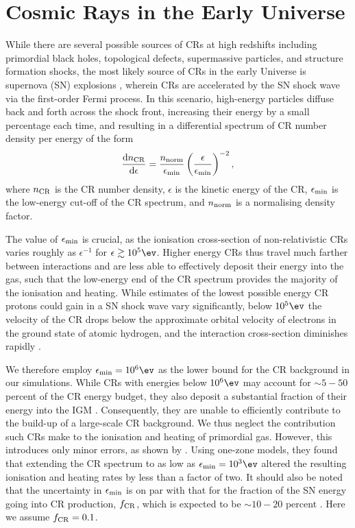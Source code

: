 \section{Cosmic Rays in the Early Universe}
\label{sec:context}
While there are several possible sources of CRs at high redshifts including primordial black holes, topological defects, supermassive particles, and structure formation shocks, the most likely source of CRs in the early Universe is supernova (SN) explosions \citep[e.g.,][]{GinzburgSyrovatskii1969,BiermannSigl2001,Stanev2004,Pfrommeretal2006}, wherein CRs are accelerated by the SN shock wave via the first-order Fermi process.  In this scenario, high-energy particles diffuse back and forth across the shock front, increasing their energy by a small percentage each time, and resulting in a differential spectrum of CR number density per energy \citep{Longair1994} of the form
\begin{equation}
    \frac{{\rm d}n_{\rm \small CR}}{{\rm d}\epsilon} = \frac{n_{\rm norm}}{\epsilon_{\rm min}}
    \left( \frac{\epsilon}{\epsilon_{\rm min}} \right)^{-2},
\end{equation}
where $n_{\rm \small CR}$ is the CR number density, $\epsilon$ is the kinetic energy of the CR, $\epsilon_{\rm min}$ is the low-energy cut-off of the CR spectrum, and $n_{\rm norm}$ is a normalising density factor. 

The value of $\epsilon_{\rm min}$ is crucial, as the ionisation cross-section of non-relativistic CRs varies roughly as $\epsilon^{-1}$ for $\epsilon \gtrsim 10^5\ev$. Higher energy CRs thus travel much farther between interactions and are less able to effectively deposit their energy into the gas, such that the low-energy end of the CR spectrum provides the majority of the ionisation and heating.  While estimates of the lowest possible energy CR protons could gain in a SN shock wave vary significantly, below $10^5\ev$ the velocity of the CR drops below the approximate orbital velocity of electrons in the ground state of atomic hydrogen, and the interaction cross-section diminishes rapidly \citep{Schlickeiser2002}. 

We therefore employ $\epsilon_{\rm min} = 10^6\ev$ as the lower bound for the CR background in our simulations.  While CRs with energies below $10^6\ev$ may account for $\sim$$5-50$ percent of the CR energy budget, they also deposit a substantial fraction of their energy into the IGM \citep{SazonovSunyaev2015}. Consequently, they are unable to efficiently contribute to the build-up of a large-scale CR background. We thus neglect the contribution such CRs make to the ionisation and heating of primordial gas. However, this introduces only minor errors, as shown by \citet{StacyBromm2007}. Using one-zone models, they found that extending the CR spectrum to as low as $\epsilon_{\rm min} = 10^3\ev$ altered the resulting ionisation and heating rates by less than a factor of two.  It should also be noted that the uncertainty in $\epsilon_{\rm min}$ is on par with that for the fraction of the SN energy going into CR production, $f_{\rm \small CR}$, which is expected to be $\sim$$10-20$ percent \citep{CaprioliSpitkovsky2014}.  Here we assume $f_{\rm \small CR} = 0.1$.

